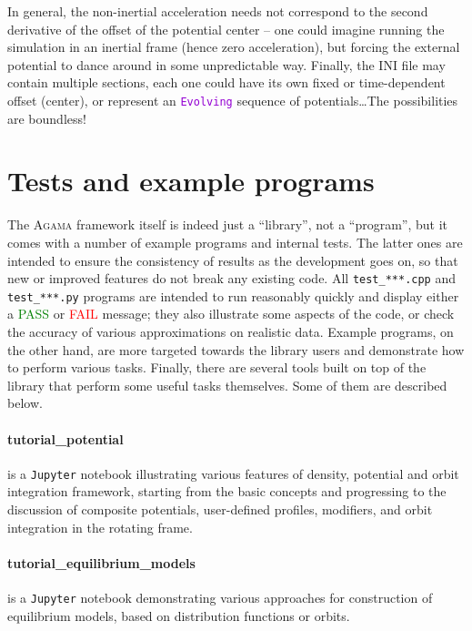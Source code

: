 \documentclass[12pt]{article}
\newcommand{\Agama}{\textsc{Agama}\xspace}
\newcommand{\ttt}[1]{\textcolor{darkviolet}{\texttt{#1}}}
\begin{document}
In general, the non-inertial acceleration needs not correspond to the second derivative of the offset of the potential center -- one could imagine running the simulation in an inertial frame (hence zero acceleration), but forcing the external potential to dance around in some unpredictable way. Finally, the INI file may contain multiple sections, each one could have its own fixed or time-dependent offset (center), or represent an \ttt{Evolving} sequence of potentials\dots The possibilities are boundless!


\section{Tests and example programs}  \label{sec:ExamplesTests}

The \Agama framework itself is indeed just a ``library'', not a ``program'', but it comes with a number of example programs and internal tests. The latter ones are intended to ensure the consistency of results as the development goes on, so that new or improved features do not break any existing code. All \texttt{test_***.cpp} and \texttt{test_***.py} programs are intended to run reasonably quickly and display either a \textcolor{Green}{PASS} or \textcolor{Red}{FAIL} message; they also illustrate some aspects of the code, or check the accuracy of various approximations on realistic data. Example programs, on the other hand, are more targeted towards the library users and demonstrate how to perform various tasks. Finally, there are several tools built on top of the library that perform some useful tasks themselves. Some of them are described below.

\paragraph{tutorial_potential} is a \texttt{Jupyter} notebook illustrating various features of density, potential and orbit integration framework, starting from the basic concepts and progressing to the discussion of composite potentials, user-defined profiles, modifiers, and orbit integration in the rotating frame.

\paragraph{tutorial_equilibrium_models} is a \texttt{Jupyter} notebook demonstrating various approaches for construction of equilibrium models, based on distribution functions or orbits.
\end{document}
